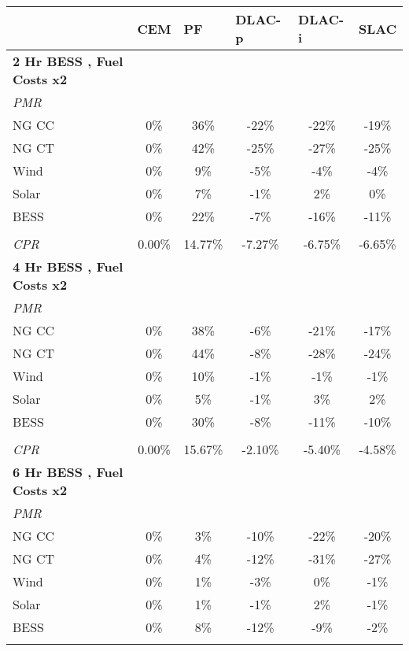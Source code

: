 \begin{table}[]
\centering
\begin{tabular}{lccccc}
\hline
& \multicolumn{1}{l}{\textbf{CEM}} & \multicolumn{1}{l}{\textbf{PF}} & \multicolumn{1}{l}{\textbf{DLAC-p}} & \multicolumn{1}{l}{\textbf{DLAC-i}} & \multicolumn{1}{l}{\textbf{SLAC}} \\ \hline
\textbf{2 Hr BESS , Fuel Costs x2} &  &  &  &  & \\
 \quad \textit{PMR}  &  &  &  &  & \\
\qquad NG CC & 0\% & 36\% & -22\% & -22\% & -19\% \\
\qquad NG CT & 0\% & 42\% & -25\% & -27\% & -25\% \\
\qquad Wind & 0\% & 9\% & -5\% & -4\% & -4\% \\
\qquad Solar & 0\% & 7\% & -1\% & 2\% & 0\% \\
\qquad BESS & 0\% & 22\% & -7\% & -16\% & -11\% \\
&  &  &  &  & \\
\quad \textit{CPR} & 0.00\% & 14.77\% & -7.27\% & -6.75\% & -6.65\% \\\hline
\textbf{4 Hr BESS , Fuel Costs x2} &  &  &  &  & \\
 \quad \textit{PMR}  &  &  &  &  & \\
\qquad NG CC & 0\% & 38\% & -6\% & -21\% & -17\% \\
\qquad NG CT & 0\% & 44\% & -8\% & -28\% & -24\% \\
\qquad Wind & 0\% & 10\% & -1\% & -1\% & -1\% \\
\qquad Solar & 0\% & 5\% & -1\% & 3\% & 2\% \\
\qquad BESS & 0\% & 30\% & -8\% & -11\% & -10\% \\
&  &  &  &  & \\
\quad \textit{CPR} & 0.00\% & 15.67\% & -2.10\% & -5.40\% & -4.58\% \\\hline
\textbf{6 Hr BESS , Fuel Costs x2} &  &  &  &  & \\
 \quad \textit{PMR}  &  &  &  &  & \\
\qquad NG CC & 0\% & 3\% & -10\% & -22\% & -20\% \\
\qquad NG CT & 0\% & 4\% & -12\% & -31\% & -27\% \\
\qquad Wind & 0\% & 1\% & -3\% & 0\% & -1\% \\
\qquad Solar & 0\% & 1\% & -1\% & 2\% & -1\% \\
\qquad BESS & 0\% & 8\% & -12\% & -9\% & -2\% \\
&  &  &  &  & \\

\end{tabular}
\end{table}
